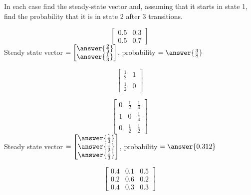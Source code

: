 \documentclass{ximera}
\begin{document}
\begin{problem}
In each case find the steady-state vector and, assuming that it starts in state 1, find the probability that it is in state 2 after $3$ transitions.

\begin{problem}\label{prob:SteadyState&ProbVec1}
$$\begin{bmatrix}
0.5 & 0.3 \\
0.5 & 0.7
\end{bmatrix}$$
Steady state vector $ = \begin{bmatrix}
\answer{\frac{2}{3}} \\
\answer{\frac{1}{3}}
\end{bmatrix}$, probability $ = \answer{\frac{3}{8}}$
\end{problem}
\begin{problem}\label{prob:SteadyState&ProbVec2}
$$\begin{bmatrix}
\frac{1}{2} & 1 \\
\frac{1}{2} & 0
\end{bmatrix}$$
\end{problem}
\begin{problem}\label{prob:SteadyState&ProbVec3}
$$\begin{bmatrix}
	0 & \frac{1}{2} & \frac{1}{4} \\
	1 & 0 & \frac{1}{4} \\
	0 & \frac{1}{2} & \frac{1}{2}
\end{bmatrix}$$ 
Steady state vector $ = \begin{bmatrix}
\answer{\frac{1}{3}} \\
\answer{\frac{1}{3}} \\
\answer{\frac{1}{3}}
\end{bmatrix}$, probability $ = \answer{0.312}$
\end{problem}
\begin{problem}
$$\begin{bmatrix}
0.4 & 0.1 & 0.5 \\
0.2 & 0.6 & 0.2 \\
0.4 & 0.3 & 0.3
\end{bmatrix}$$
\end{problem}
\end{problem}
\end{document}
